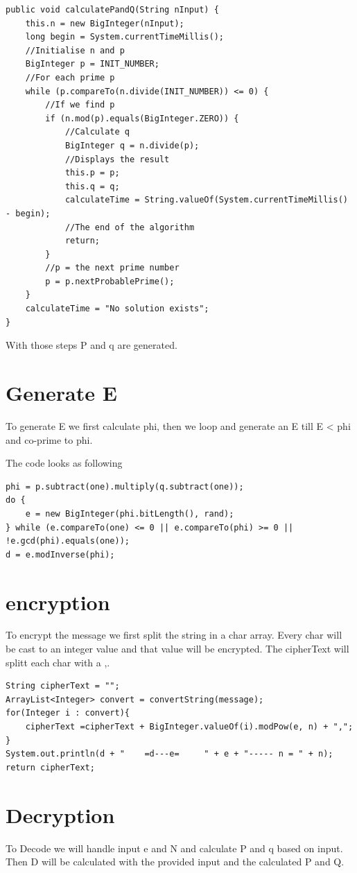 \begin{lstlisting}
public void calculatePandQ(String nInput) {
    this.n = new BigInteger(nInput);
    long begin = System.currentTimeMillis();
    //Initialise n and p
    BigInteger p = INIT_NUMBER;
    //For each prime p
    while (p.compareTo(n.divide(INIT_NUMBER)) <= 0) {
        //If we find p
        if (n.mod(p).equals(BigInteger.ZERO)) {
            //Calculate q
            BigInteger q = n.divide(p);
            //Displays the result
            this.p = p;
            this.q = q;
            calculateTime = String.valueOf(System.currentTimeMillis() - begin);
            //The end of the algorithm
            return;
        }
        //p = the next prime number
        p = p.nextProbablePrime();
    }
    calculateTime = "No solution exists";
}
\end{lstlisting}

With those steps P and q are generated.

\section{Generate E}
To generate E we first calculate phi, then we loop and generate an E till E  < phi and co-prime to phi.

The code looks as following
\begin{lstlisting}  
phi = p.subtract(one).multiply(q.subtract(one));
do {
    e = new BigInteger(phi.bitLength(), rand);
} while (e.compareTo(one) <= 0 || e.compareTo(phi) >= 0 || !e.gcd(phi).equals(one));
d = e.modInverse(phi);
\end{lstlisting}{}

\section{encryption}
To encrypt the message we first split the string in a char array.
Every char will be cast to an integer value and that value will be encrypted.
The cipherText will splitt each char with a ,.

\begin{lstlisting}
String cipherText = "";
ArrayList<Integer> convert = convertString(message);
for(Integer i : convert){
    cipherText =cipherText + BigInteger.valueOf(i).modPow(e, n) + ",";
}
System.out.println(d + "    =d---e=     " + e + "----- n = " + n);
return cipherText;
\end{lstlisting}{}


\section{Decryption}
To Decode we will handle input e and N and calculate P and q based on input.
Then D will be calculated with the provided input and the calculated P and Q.

